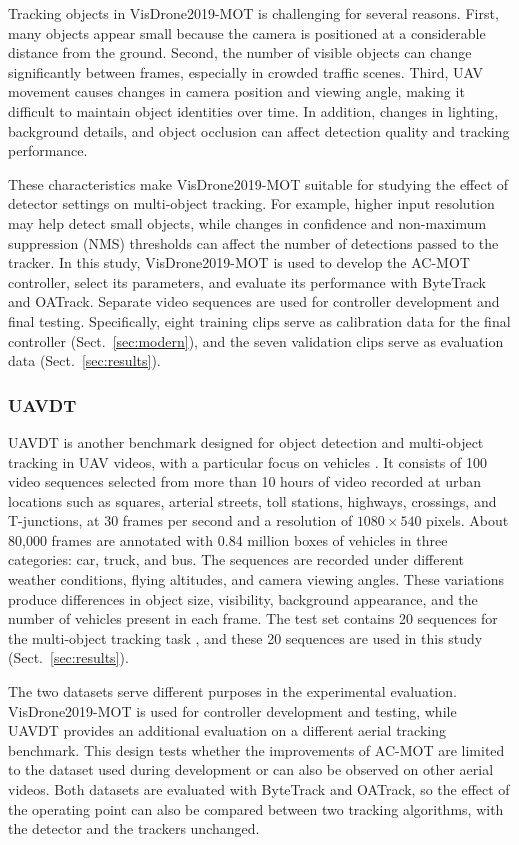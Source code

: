 \documentclass[pdflatex,sn-mathphys-num,iicol]{sn-jnl}
\begin{document}
Tracking objects in VisDrone2019-MOT is challenging for several reasons. First, many objects appear small because the camera is positioned at a considerable distance from the ground. Second, the number of visible objects can change significantly between frames, especially in crowded traffic scenes. Third, UAV movement causes changes in camera position and viewing angle, making it difficult to maintain object identities over time. In addition, changes in lighting, background details, and object occlusion can affect detection quality and tracking performance.

These characteristics make VisDrone2019-MOT suitable for studying the effect of detector settings on multi-object tracking. For example, higher input resolution may help detect small objects, while changes in confidence and non-maximum suppression (NMS) thresholds can affect the number of detections passed to the tracker. In this study, VisDrone2019-MOT is used to develop the AC-MOT controller, select its parameters, and evaluate its performance with ByteTrack and OATrack. Separate video sequences are used for controller development and final testing. Specifically, eight training clips
serve as calibration data for the final controller (Sect.~\ref{sec:modern}),
and the seven validation clips serve as evaluation data
(Sect.~\ref{sec:results}).

\subsubsection{UAVDT}
UAVDT is another benchmark designed for object detection and multi-object
tracking in UAV videos, with a particular focus on vehicles \cite{du2018uavdt}.
It consists of 100 video sequences selected from more than 10 hours of video
recorded at urban locations such as squares, arterial streets, toll stations,
highways, crossings, and T-junctions, at 30 frames per second and a resolution
of $1080\times540$ pixels. About 80,000 frames are annotated with 0.84 million
boxes of vehicles in three categories: car, truck, and bus. The sequences are
recorded under different weather conditions, flying altitudes, and camera
viewing angles. These variations produce differences in object size,
visibility, background appearance, and the number of vehicles present in each
frame. The test set contains 20 sequences for the multi-object tracking task
\cite{du2018uavdt}, and these 20 sequences are used in this study
(Sect.~\ref{sec:results}).

The two datasets serve different purposes in the experimental evaluation. VisDrone2019-MOT is used for controller development and testing, while UAVDT provides an additional evaluation on a different aerial tracking benchmark. This design tests whether the improvements of AC-MOT are limited to the dataset used during development or can also be observed on other aerial videos. Both datasets are evaluated with ByteTrack and OATrack, so the effect of the operating point can also be compared between two tracking algorithms, with the detector and the trackers unchanged.
\end{document}
